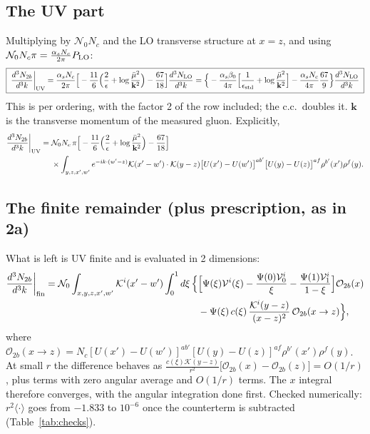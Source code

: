 \documentclass[10pt]{article}
\numberwithin{equation}{section}
\newcommand{\KK}{\mathcal K}
\newcommand{\Nz}{\mathcal N_0}
\newcommand{\OO}{\mathcal O}
\newcommand{\VV}{\mathcal V}
\newcommand{\mub}{\bar\mu}
\newcommand{\ve}{\epsilon}
\begin{document}
\subsection{The UV part}
Multiplying by $\Nz N_c$ and the LO transverse structure at $x=z$, and using $\Nz N_c\pi=\frac{\alpha_sN_c}{2\pi}P_{\rm LO}$:
\begin{equation}
\boxed{\;\frac{d^3N_{2b}}{d^3k}\bigg|_{\rm UV}=\frac{\alpha_sN_c}{2\pi}\Big[-\frac{11}{6}\Big(\frac2\ve+\log\frac{\mub^2}{\mathbf k^2}\Big)-\frac{67}{18}\Big]\frac{d^3N_{\rm LO}}{d^3k}
=\Big\{-\frac{\alpha_s\beta_0}{4\pi}\Big[\frac{1}{\ve_{\rm std}}+\log\frac{\mub^2}{\mathbf k^2}\Big]-\frac{\alpha_sN_c}{4\pi}\frac{67}{9}\Big\}\frac{d^3N_{\rm LO}}{d^3k}\;}
\label{eq:2bUV}
\end{equation}
This is per ordering, with the factor 2 of the row included; the c.c.\ doubles it. $\mathbf k$ is the transverse momentum of the measured gluon. Explicitly,
\begin{align}
\frac{d^3N_{2b}}{d^3k}\bigg|_{\rm UV}={}&\Nz N_c\,\pi\Big[-\frac{11}{6}\Big(\frac2\ve+\log\frac{\mub^2}{\mathbf k^2}\Big)-\frac{67}{18}\Big]\notag\\
&\times\int_{y,z,x',w'}e^{-ik\cdot(w'-z)}\KK(x'-w')\cdot\KK(y-z)\big[U(x')-U(w')\big]^{ab'}\big[U(y)-U(z)\big]^{af}\rho^{b'}(x')\rho^f(y).
\end{align}

\subsection{The finite remainder (plus prescription, as in 2a)}
What is left is UV finite and is evaluated in 2 dimensions:
\begin{align}
\frac{d^3N_{2b}}{d^3k}\bigg|_{\rm fin}=\Nz\int_{x,y,z,x',w'}\KK^i(x'-w')\int_0^1d\xi\,\Big\{&\Big[\Psi(\xi)\VV^i(\xi)-\frac{\Psi(0)\VV_0^i}{\xi}-\frac{\Psi(1)\VV_1^i}{1-\xi}\Big]\OO_{2b}(x)\notag\\
&-\Psi(\xi)\,c(\xi)\,\frac{\KK^i(y-z)}{(x-z)^2}\,\OO_{2b}(x\to z)\Big\},
\label{eq:2bfin}
\end{align}
where $\OO_{2b}(x\to z)=N_c[U(x')-U(w')]^{ab'}[U(y)-U(z)]^{af}\rho^{b'}(x')\rho^f(y)$. At small $r$ the difference behaves as $\frac{c(\xi)\KK(y-z)}{r^2}\big[\OO_{2b}(x)-\OO_{2b}(z)\big]=O(1/r)$, plus terms with zero angular average and $O(1/r)$ terms. The $x$ integral therefore converges, with the angular integration done first. Checked numerically: $r^2\langle\cdot\rangle$ goes from $-1.833$ to $10^{-6}$ once the counterterm is subtracted (Table~\ref{tab:checks}).
\end{document}
